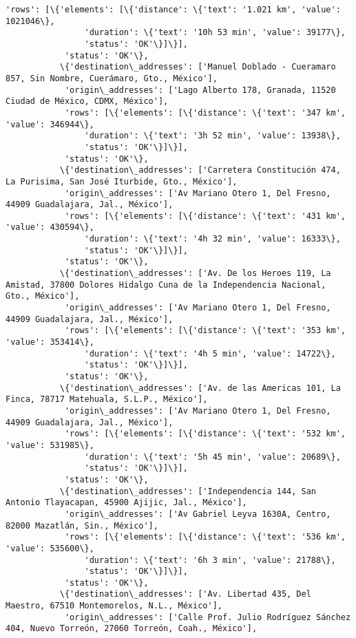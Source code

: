 \documentclass[11pt]{article}
\begin{document}
\begin{Verbatim}[commandchars=\\\{\}]
            'rows': [\{'elements': [\{'distance': \{'text': '1.021 km', 'value': 1021046\},
                'duration': \{'text': '10h 53 min', 'value': 39177\},
                'status': 'OK'\}]\}],
            'status': 'OK'\},
           \{'destination\_addresses': ['Manuel Doblado - Cueramaro 857, Sin Nombre, Cuerámaro, Gto., México'],
            'origin\_addresses': ['Lago Alberto 178, Granada, 11520 Ciudad de México, CDMX, México'],
            'rows': [\{'elements': [\{'distance': \{'text': '347 km', 'value': 346944\},
                'duration': \{'text': '3h 52 min', 'value': 13938\},
                'status': 'OK'\}]\}],
            'status': 'OK'\},
           \{'destination\_addresses': ['Carretera Constitución 474, La Purisima, San José Iturbide, Gto., México'],
            'origin\_addresses': ['Av Mariano Otero 1, Del Fresno, 44909 Guadalajara, Jal., México'],
            'rows': [\{'elements': [\{'distance': \{'text': '431 km', 'value': 430594\},
                'duration': \{'text': '4h 32 min', 'value': 16333\},
                'status': 'OK'\}]\}],
            'status': 'OK'\},
           \{'destination\_addresses': ['Av. De los Heroes 119, La Amistad, 37800 Dolores Hidalgo Cuna de la Independencia Nacional, Gto., México'],
            'origin\_addresses': ['Av Mariano Otero 1, Del Fresno, 44909 Guadalajara, Jal., México'],
            'rows': [\{'elements': [\{'distance': \{'text': '353 km', 'value': 353414\},
                'duration': \{'text': '4h 5 min', 'value': 14722\},
                'status': 'OK'\}]\}],
            'status': 'OK'\},
           \{'destination\_addresses': ['Av. de las Americas 101, La Finca, 78717 Matehuala, S.L.P., México'],
            'origin\_addresses': ['Av Mariano Otero 1, Del Fresno, 44909 Guadalajara, Jal., México'],
            'rows': [\{'elements': [\{'distance': \{'text': '532 km', 'value': 531985\},
                'duration': \{'text': '5h 45 min', 'value': 20689\},
                'status': 'OK'\}]\}],
            'status': 'OK'\},
           \{'destination\_addresses': ['Independencia 144, San Antonio Tlayacapan, 45900 Ajijic, Jal., México'],
            'origin\_addresses': ['Av Gabriel Leyva 1630A, Centro, 82000 Mazatlán, Sin., México'],
            'rows': [\{'elements': [\{'distance': \{'text': '536 km', 'value': 535600\},
                'duration': \{'text': '6h 3 min', 'value': 21788\},
                'status': 'OK'\}]\}],
            'status': 'OK'\},
           \{'destination\_addresses': ['Av. Libertad 435, Del Maestro, 67510 Montemorelos, N.L., México'],
            'origin\_addresses': ['Calle Prof. Julio Rodríguez Sánchez 404, Nuevo Torreón, 27060 Torreón, Coah., México'],

\end{Verbatim}
\end{document}
